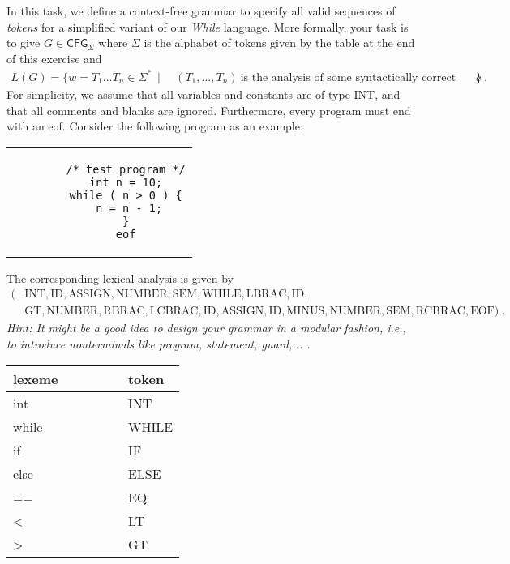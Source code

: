 \begin{exercise}{30}
%
In this task, we define a context-free grammar to specify all valid sequences of \emph{tokens} for a simplified variant of our \emph{While} language. More formally, your task is to give $G \in \textsf{CFG}_\Sigma$ where $\Sigma$
%
is the alphabet of tokens given by the table at the end of this exercise and
%
\begin{align*}
   L(G) = \big\{ w = T_1\ldots T_n \in \Sigma^* ~\mid~ & (T_1,\ldots,T_n)~\text{is the analysis of some syntactically correct program $c$}  \big\}~.
\end{align*}
%
For simplicity, we assume that all variables and constants are of type INT, and that all comments and blanks are ignored. Furthermore, every program must end with an eof. Consider the following program as an example:
%
  \begin{center}
	\begin{tabular}{c}
		\begin{lstlisting}
		/* test program */
		int n = 10;
		while ( n > 0 ) {
		 n = n - 1;
		}
		eof
		\end{lstlisting}
	\end{tabular}
\end{center}
%
The corresponding lexical analysis is given by
%
\begin{align*}
    (&\text{INT}, \text{ID}, \text{ASSIGN},\text{NUMBER},\text{SEM},\text{WHILE},\text{LBRAC},\text{ID},\\
    &\text{GT},\text{NUMBER},\text{RBRAC},\text{LCBRAC},\text{ID},\text{ASSIGN},\text{ID},\text{MINUS},\text{NUMBER},\text{SEM},\text{RCBRAC}, \text{EOF})~.
\end{align*}
%
\emph{Hint: It might be a good idea to design your grammar in a modular fashion, i.e., to introduce nonterminals like program, statement, guard,... .}

\begin{longtable}{Ll}
	\hline
	lexeme ~~~~~~~              & token  \\
	\hline
	int          & INT \\
	while      & WHILE \\
	if         & IF \\
	else       & ELSE \\
	
	==         & EQ \\
	<          & LT \\
	>          & GT \\
	

\end{longtable}
\end{exercise}

